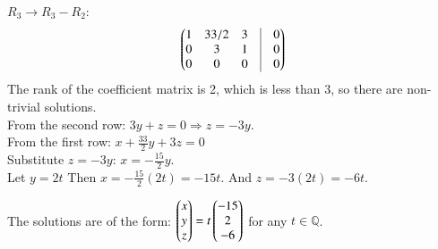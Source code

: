 \documentclass[journal]{IEEEtran}
\begin{document}
$R_3 \rightarrow R_3 - R_2$:
\begin{align}
\myvec{
1 & 33/2 & 3 & \vrule & 0 \\
0 & 3 & 1 & \vrule & 0 \\
0 & 0 & 0 & \vrule & 0
}
\end{align}
The rank of the coefficient matrix is 2, which is less than 3, so there are non-trivial solutions.\\
From the second row:
$3y + z = 0 \Rightarrow z = -3y$.\\
From the first row:
$x + \frac{33}{2}y + 3z = 0$\\
Substitute $z = -3y$:
$x = -\frac{15}{2}y$.\\


Let $y = 2t$
Then $x = -\frac{15}{2}(2t) = -15t$.
And $z = -3(2t) = -6t$.

The solutions are of the form:
$\begin{pmatrix}x \\ y \\ z\end{pmatrix} = t \begin{pmatrix}-15 \\ 2 \\ -6\end{pmatrix}$ for any $t \in \mathbb{Q}$.
\end{document}
